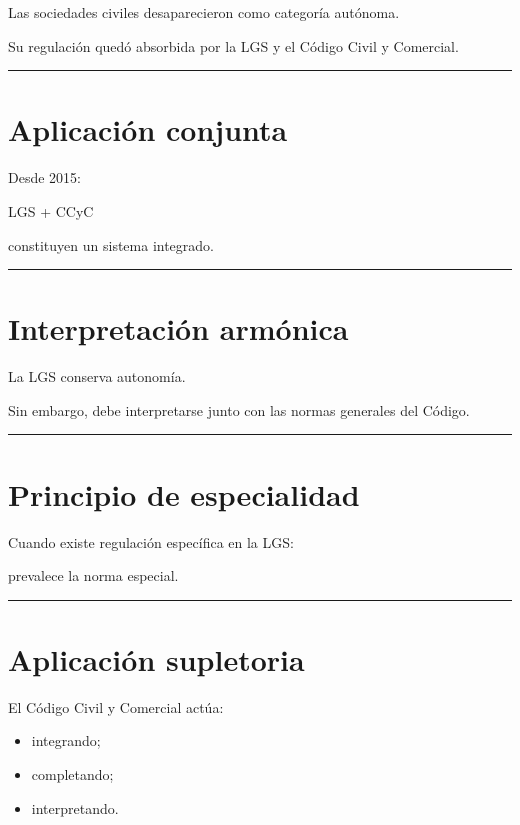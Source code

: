 \documentclass[
  spanish,
  letterpaper,
  DIV=11,
  numbers=noendperiod]{scrartcl}
\providecommand{\tightlist}{%
  \setlength{\itemsep}{0pt}\setlength{\parskip}{0pt}}
\begin{document}
Las sociedades civiles desaparecieron como categoría autónoma.

Su regulación quedó absorbida por la LGS y el Código Civil y Comercial.

\begin{center}\rule{0.5\linewidth}{0.5pt}\end{center}

\section{Aplicación conjunta}\label{aplicaciuxf3n-conjunta}

Desde 2015:

LGS + CCyC

constituyen un sistema integrado.

\begin{center}\rule{0.5\linewidth}{0.5pt}\end{center}

\section{Interpretación armónica}\label{interpretaciuxf3n-armuxf3nica}

La LGS conserva autonomía.

Sin embargo, debe interpretarse junto con las normas generales del
Código.

\begin{center}\rule{0.5\linewidth}{0.5pt}\end{center}

\section{Principio de especialidad}\label{principio-de-especialidad}

Cuando existe regulación específica en la LGS:

prevalece la norma especial.

\begin{center}\rule{0.5\linewidth}{0.5pt}\end{center}

\section{Aplicación supletoria}\label{aplicaciuxf3n-supletoria-1}

El Código Civil y Comercial actúa:

\begin{itemize}
\tightlist
\item
  integrando;
\item
  completando;
\item
  interpretando.
\end{itemize}
\end{document}
